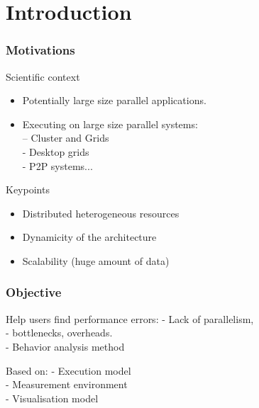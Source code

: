 \section{Introduction}

\frame
{
  \frametitle{Motivations}
\begin{block}{Scientific context}
\begin{itemize}
\item Potentially large size parallel applications.
\item Executing on large size parallel systems:\\
– Cluster and Grids \\
- Desktop grids\\
- P2P systems...
\end{itemize}
\end{block}
\begin{block}{Keypoints}
\begin{itemize}
\item Distributed heterogeneous resources
\item Dynamicity of the architecture
\item Scalability (huge amount of data)
\end{itemize}
\end{block}
}
\begin{frame}
\frametitle{Objective}
\begin{block}{Help users find performance errors:}
- Lack of parallelism, \\
- bottlenecks, overheads.\\
- Behavior analysis method
\end{block}
\begin{block}{Based on:}
- Execution model\\
- Measurement environment\\
- Visualisation model
\end{block}
\end{frame}

